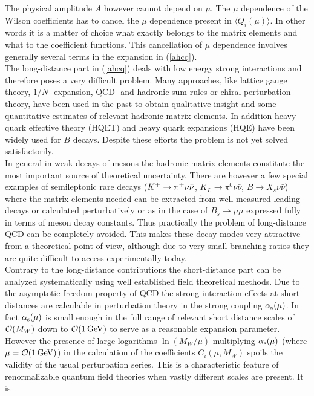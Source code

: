 The physical amplitude $A$ however cannot depend on
$\mu$. The $\mu$ dependence of the Wilson coefficients has
to cancel the $\mu$ dependence present in $\langle Q_i(\mu)\rangle$.
In other words it is a matter of choice what exactly
belongs to the matrix elements
and what to the coefficient functions. This cancellation of
$\mu$ dependence involves generally several terms in the expansion
in (\ref{ahcq}).\\
The long-distance part in (\ref{ahcq}) deals
with low energy strong interactions
and therefore poses a very difficult problem. Many approaches, like
lattice gauge theory, $1/N$- expansion, QCD- and hadronic sum rules or
chiral perturbation theory, have been used in the past to obtain
qualitative insight and some quantitative estimates of relevant
hadronic matrix elements. In addition heavy quark effective theory (HQET)
and heavy quark expansions (HQE) have been widely used for $B$ decays.
Despite these efforts the problem is not yet solved satisfactorily.
\\
In general in weak decays of mesons the hadronic matrix elements
constitute the most important source of theoretical uncertainty.  There
are however a few special examples of semileptonic rare decays ($K^+ \to \pi^+\nu\bar\nu$,
$K_L\to\pi^0\nu\bar\nu$, $B\to X_s\nu\bar\nu$) where the matrix
elements needed can be extracted from well measured leading decays or
calculated perturbatively or as in the case of $B_s \to \mu \bar \mu$
expressed fully in terms of meson decay constants. Thus practically the
problem of long-distance QCD can be completely avoided. This makes
these decay modes very attractive from a theoretical point of view,
although due to very small branching ratios they are quite difficult to
access experimentally today.
\\
Contrary to the long-distance contributions the short-distance part can
be analyzed systematically using well established field theoretical
methods. Due to the asymptotic freedom property of QCD the strong
interaction effects at short-distances are calculable in perturbation
theory in the strong coupling $\alpha_{\rm s}(\mu)$. In fact $\alpha_{\rm s}(\mu)$ is small
enough in the full range of relevant short distance scales of
${\cal O}(M_W)$ down to ${\cal O}(1\, {\rm GeV})$ to serve as a reasonable expansion
parameter. However the presence of large logarithms $\ln(M_W/\mu)$
multiplying $\alpha_{\rm s}(\mu)$ (where $\mu={\cal O}(1\, {\rm GeV})$) in the calculation of
the coefficients $C_i(\mu, M_W)$ spoils the validity of the usual
perturbation series. This is a characteristic feature of renormalizable
quantum field theories when vastly different scales are present.  It is
